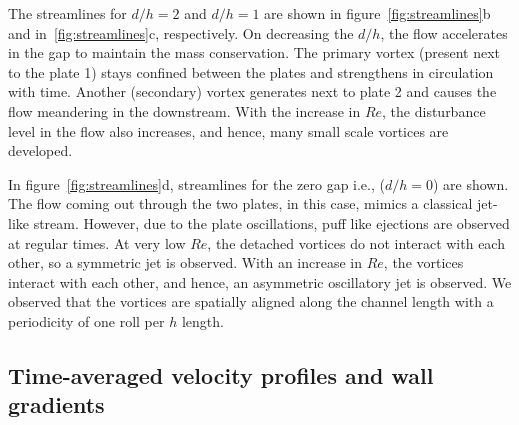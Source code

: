 \documentclass[aps,pre,twocolumn,aps,longbibliography]{revtex4-1}
\begin{document}
	The streamlines for $d/h=2$ and $d/h=1$ are shown in figure~\ref{fig:streamlines}b and in~\ref{fig:streamlines}c, respectively. On decreasing the $d/h$, the flow accelerates in the gap to maintain the mass conservation. The primary vortex (present next to the plate 1) stays confined between the plates and strengthens in circulation with time. Another (secondary) vortex generates next to plate 2 and causes the flow meandering in the downstream. With the increase in $Re$, the disturbance level in the flow also increases, and hence, many small scale vortices are developed.
	
	In figure~\ref{fig:streamlines}d, streamlines for the zero gap i.e., ($d/h=0$) are shown. The flow coming out through the two plates, in this case, mimics a classical jet-like stream. However, due to the plate oscillations, puff like ejections are observed at regular times. At very low $Re$, the detached vortices do not interact with each other, so a symmetric jet is observed. With an increase in $Re$, the vortices interact with each other, and hence, an asymmetric oscillatory jet is observed. We observed that the vortices are spatially aligned along the channel length with a periodicity of one roll per $h$ length.
	
	
	\subsection{Time-averaged velocity profiles and wall gradients}
	
\end{document}
